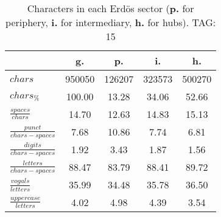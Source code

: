 \begin{table}[h!]
\begin{center}
\begin{tabular}{| l | c | c | c | c |}\hline
 & g. & p. & i. & h. \\\hline
$chars$ & 950050  & 126207  & 323573  & 500270 \\\hline
$chars_{\%}$ & 100.00  & 13.28  & 34.06  & 52.66 \\\hline
$\frac{spaces}{chars}$ & 14.70  & 12.63  & 14.83  & 15.13 \\\hline
$\frac{punct}{chars-spaces}$ & 7.68  & 10.86  & 7.74  & 6.81 \\\hline
$\frac{digits}{chars-spaces}$ & 1.92  & 3.43  & 1.87  & 1.56 \\\hline
$\frac{letters}{chars-spaces}$ & 88.47  & 83.79  & 88.41  & 89.72 \\\hline
$\frac{vogals}{letters}$ & 35.99  & 34.48  & 35.78  & 36.50 \\\hline
$\frac{uppercase}{letters}$ & 4.02  & 4.98  & 4.39  & 3.54 \\\hline
\end{tabular}
\caption{Characters in each Erd\"os sector ({{\bf p.}} for periphery, {{\bf i.}} for intermediary, 
    {{\bf h.}} for hubs). TAG: 15}
\end{center}
\end{table}